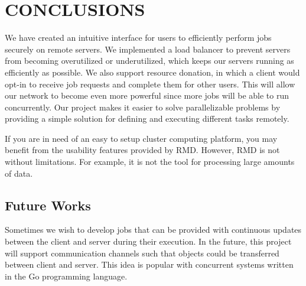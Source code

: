 \section{CONCLUSIONS}\label{sec:conclusions}

We have created an intuitive interface for users to efficiently
perform jobs securely on remote servers.
We implemented a load balancer to prevent servers from becoming
overutilized or underutilized, which keeps our servers running
as efficiently as possible.
We also support resource donation, in which a client would
opt-in to receive job requests and complete them for other users.
This will allow our network
to become even more powerful since more jobs will be able
to run concurrently.
Our project makes it easier to solve
parallelizable problems by providing a simple solution for
defining and executing different tasks remotely.

If you are in need of an easy to setup cluster computing
platform, you may benefit from the usability features
provided by RMD.
However, RMD is not without limitations.
For example, it is not the tool for processing
large amounts of data.


\subsection{Future Works}\label{subsec:futureWorks}

Sometimes we wish to develop jobs that can be provided with
continuous updates between the client and server during their
execution.
In the future, this project will support communication
channels such that objects could be transferred between
client and server.
This idea is popular with concurrent systems written in
the Go programming language.
